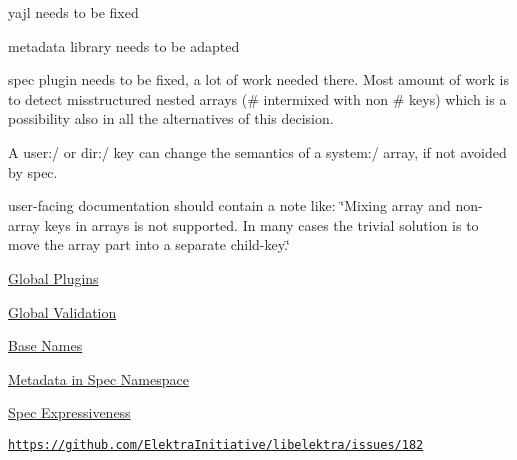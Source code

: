 \begin{DoxyItemize}
\item yajl needs to be fixed
\item metadata library needs to be adapted
\item spec plugin needs to be fixed, a lot of work needed there. Most amount of work is to detect misstructured nested arrays ({\ttfamily \#} intermixed with non {\ttfamily \#} keys) which is a possibility also in all the alternatives of this decision.
\item A {\ttfamily user\+:/} or {\ttfamily dir\+:/} key can change the semantics of a {\ttfamily system\+:/} array, if not avoided by {\ttfamily spec}.
\item user-\/facing documentation should contain a note like\+: \char`\"{}\+Mixing array and non-\/array keys in arrays is not supported.
  In many cases the trivial solution is to move the array part into a separate child-\/key.\char`\"{}
\end{DoxyItemize}


\begin{DoxyItemize}
\item \hyperlink{doc_decisions_global_plugins_md}{Global Plugins}
\item \hyperlink{doc_decisions_global_validation_md}{Global Validation}
\item \hyperlink{doc_decisions_base_name_md}{Base Names}
\item \hyperlink{doc_decisions_spec_metadata_md}{Metadata in Spec Namespace}
\item \hyperlink{doc_decisions_spec_expressiveness_md}{Spec Expressiveness}
\end{DoxyItemize}

\href{https://github.com/ElektraInitiative/libelektra/issues/182}{\tt https\+://github.\+com/\+Elektra\+Initiative/libelektra/issues/182} 